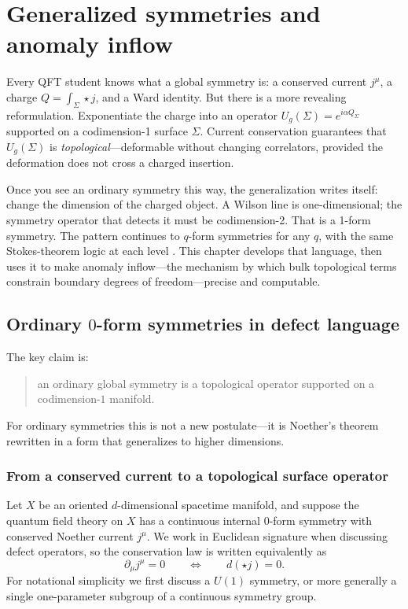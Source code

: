 \chapter{Generalized symmetries and anomaly inflow}\label{ch:gensym}

Every QFT student knows what a global symmetry is: a conserved current $j^\mu$, a charge $Q = \int_\Sigma \star j$, and a Ward identity.  But there is a more revealing reformulation.  Exponentiate the charge into an operator $U_g(\Sigma) = e^{i\alpha Q_\Sigma}$ supported on a codimension-1 surface $\Sigma$.  Current conservation guarantees that $U_g(\Sigma)$ is \emph{topological}---deformable without changing correlators, provided the deformation does not cross a charged insertion.

Once you see an ordinary symmetry this way, the generalization writes itself: change the dimension of the charged object.  A Wilson line is one-dimensional; the symmetry operator that detects it must be codimension-2.  That is a 1-form symmetry.  The pattern continues to $q$-form symmetries for any $q$, with the same Stokes-theorem logic at each level \cite{GKSW2015,Bhardwaj2023Lectures}.  This chapter develops that language, then uses it to make anomaly inflow---the mechanism by which bulk topological terms constrain boundary degrees of freedom---precise and computable.

\section{Ordinary \texorpdfstring{$0$}{0}-form symmetries in defect language}\label{sec:zero-form-defects}

The key claim is:
\begin{quote}
an ordinary global symmetry is a topological operator supported on a codimension-$1$ manifold.
\end{quote}
For ordinary symmetries this is not a new postulate---it is Noether's theorem rewritten in a form that generalizes to higher dimensions.

\subsection{From a conserved current to a topological surface operator}

\begin{assumption}\label{ass:zero-form-standing}
Let $X$ be an oriented $d$-dimensional spacetime manifold, and suppose the quantum field theory on $X$ has a continuous internal $0$-form symmetry with conserved Noether current $j^\mu$. We work in Euclidean signature when discussing defect operators, so the conservation law is written equivalently as
\begin{equation}\label{eq:noether-conservation-forms}
\partial_\mu j^\mu = 0
\qquad\Longleftrightarrow\qquad
d(\star j)=0.
\end{equation}
For notational simplicity we first discuss a $U(1)$ symmetry, or more generally a single one-parameter subgroup of a continuous symmetry group.
\end{assumption}

